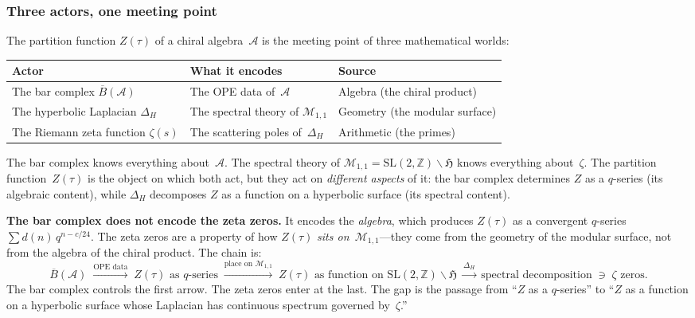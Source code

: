 \documentclass[11pt]{article}
\newcommand{\cA}{\mathcal{A}}
\newcommand{\cM}{\mathcal{M}}
\newcommand{\barB}{\overline{B}}
\providecommand{\bZ}{\mathbb{Z}}
\begin{document}
\subsubsection{Three actors, one meeting point}

The partition function $Z(\tau)$ of a chiral algebra~$\cA$ is
the meeting point of three mathematical worlds:

\begin{center}
\small
\renewcommand{\arraystretch}{1.4}
\begin{tabular}{@{}lll@{}}
\textbf{Actor} & \textbf{What it encodes} & \textbf{Source} \\
\hline
The bar complex $\barB(\cA)$
  & The OPE data of~$\cA$
  & Algebra (the chiral product) \\[3pt]
The hyperbolic Laplacian $\Delta_H$
  & The spectral theory of $\cM_{1,1}$
  & Geometry (the modular surface) \\[3pt]
The Riemann zeta function $\zeta(s)$
  & The scattering poles of~$\Delta_H$
  & Arithmetic (the primes)
\end{tabular}
\end{center}

\noindent The bar complex knows everything about~$\cA$.  The
spectral theory of $\cM_{1,1} = \mathrm{SL}(2,\bZ)\backslash
\mathfrak{H}$ knows everything about~$\zeta$.  The partition
function~$Z(\tau)$ is the object on which both act, but
they act on \emph{different aspects} of it: the bar complex
determines $Z$ as a $q$-series (its algebraic content), while
$\Delta_H$ decomposes $Z$ as a function on a hyperbolic
surface (its spectral content).

\textbf{The bar complex does not encode the zeta zeros.}
It encodes the \emph{algebra}, which produces $Z(\tau)$
as a convergent $q$-series $\sum d(n)\, q^{n - c/24}$.
The zeta zeros are a property of how $Z(\tau)$ \emph{sits
on~$\cM_{1,1}$}---they come from the geometry of the modular
surface, not from the algebra of the chiral product.  The
chain is:
\[
  \barB(\cA)
  \;\xrightarrow{\text{OPE data}}\;
  Z(\tau) \text{ as $q$-series}
  \;\xrightarrow{\text{place on $\cM_{1,1}$}}\;
  Z(\tau) \text{ as function on $\mathrm{SL}(2,\bZ)
  \backslash\mathfrak{H}$}
  \;\xrightarrow{\Delta_H}\;
  \text{spectral decomposition}
  \;\ni\; \zeta\text{ zeros}.
\]
The bar complex controls the first arrow.  The zeta zeros
enter at the last.  The gap is the passage from ``$Z$ as a
$q$-series'' to ``$Z$ as a function on a hyperbolic surface
whose Laplacian has continuous spectrum governed by~$\zeta$.''
\end{document}
